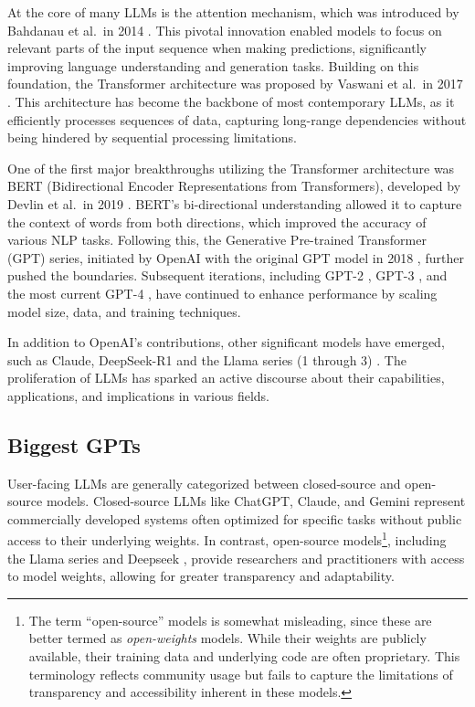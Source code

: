 \documentclass[
  a4paper,
  DIV=11,
  numbers=noendperiod]{scrreprt}
\theoremstyle{definition}
\theoremstyle{remark}
\begin{document}
At the core of many LLMs is the attention mechanism, which was
introduced by Bahdanau et al.~in 2014 \autocite{bahdanau2016}. This
pivotal innovation enabled models to focus on relevant parts of the
input sequence when making predictions, significantly improving language
understanding and generation tasks. Building on this foundation, the
Transformer architecture was proposed by Vaswani et al.~in 2017
\autocite{vaswani2023}. This architecture has become the backbone of
most contemporary LLMs, as it efficiently processes sequences of data,
capturing long-range dependencies without being hindered by sequential
processing limitations.

One of the first major breakthroughs utilizing the Transformer
architecture was BERT (Bidirectional Encoder Representations from
Transformers), developed by Devlin et al.~in 2019 \autocite{devlin2019}.
BERT's bi-directional understanding allowed it to capture the context of
words from both directions, which improved the accuracy of various NLP
tasks. Following this, the Generative Pre-trained Transformer (GPT)
series, initiated by OpenAI with the original GPT model in 2018
\autocite{radford2018}, further pushed the boundaries. Subsequent
iterations, including GPT-2 \autocite{radford2019}, GPT-3
\autocite{brown2020}, and the most current GPT-4 \autocite{openai2024},
have continued to enhance performance by scaling model size, data, and
training techniques.

In addition to OpenAI's contributions, other significant models have
emerged, such as Claude, DeepSeek-R1 and the Llama series (1 through 3)
\autocite{claude,deepseek-ai2025,grattafiori2024}. The proliferation of
LLMs has sparked an active discourse about their capabilities,
applications, and implications in various fields.

\subsection{Biggest GPTs}\label{biggest-gpts}

User-facing LLMs are generally categorized between closed-source and
open-source models. Closed-source LLMs like ChatGPT, Claude, and Gemini
\autocite{chatgpt,claude,gemini} represent commercially developed
systems often optimized for specific tasks without public access to
their underlying weights. In contrast, open-source models\footnote{The
  term ``open-source'' models is somewhat misleading, since these are
  better termed as \emph{open-weights} models. While their weights are
  publicly available, their training data and underlying code are often
  proprietary. This terminology reflects community usage but fails to
  capture the limitations of transparency and accessibility inherent in
  these models.}, including the Llama series \autocite{grattafiori2024}
and Deepseek \autocite{deepseek-ai2025}, provide researchers and
practitioners with access to model weights, allowing for greater
transparency and adaptability.
\end{document}
